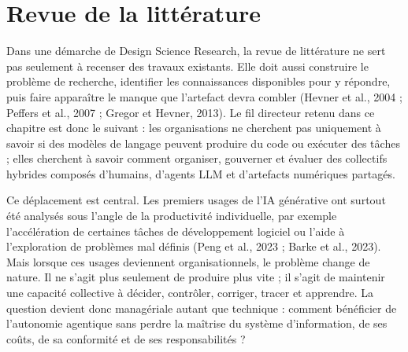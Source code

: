 
\chapter{Revue de la litt\'erature}\label{chap:revue}

Dans une démarche de Design Science Research, la revue de littérature ne sert pas seulement à recenser des travaux existants. Elle doit aussi construire le problème de recherche, identifier les connaissances disponibles pour y répondre, puis faire apparaître le manque que l'artefact devra combler (Hevner et al., 2004 ; Peffers et al., 2007 ; Gregor et Hevner, 2013). Le fil directeur retenu dans ce chapitre est donc le suivant : les organisations ne cherchent pas uniquement à savoir si des modèles de langage peuvent produire du code ou exécuter des tâches ; elles cherchent à savoir comment organiser, gouverner et évaluer des collectifs hybrides composés d'humains, d'agents LLM et d'artefacts numériques partagés.

Ce déplacement est central. Les premiers usages de l'IA générative ont surtout été analysés sous l'angle de la productivité individuelle, par exemple l'accélération de certaines tâches de développement logiciel ou l'aide à l'exploration de problèmes mal définis (Peng et al., 2023 ; Barke et al., 2023). Mais lorsque ces usages deviennent organisationnels, le problème change de nature. Il ne s'agit plus seulement de produire plus vite ; il s'agit de maintenir une capacité collective à décider, contrôler, corriger, tracer et apprendre. La question devient donc managériale autant que technique : comment bénéficier de l'autonomie agentique sans perdre la maîtrise du système d'information, de ses coûts, de sa conformité et de ses responsabilités ?

